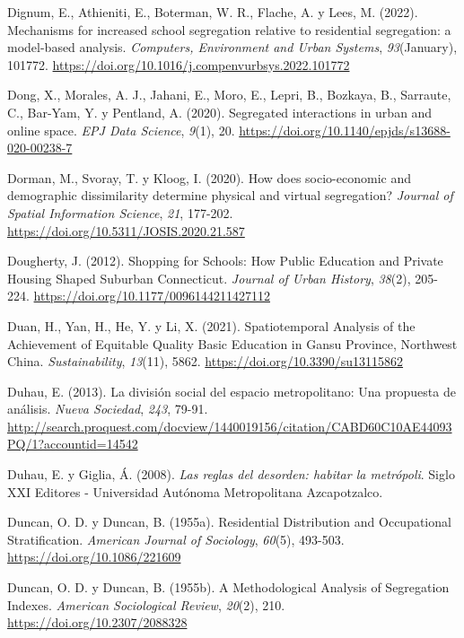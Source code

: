 \documentclass[
  spanish,
  a4paper,%
  chapterprefix=true,%
  DIV=calc,%
  twoside]{scrbook}%
\newlength{\cslhangindent}
\newenvironment{CSLReferences}[2] %
 {\begin{list}{}{%
  \setlength{\itemindent}{0pt}
  \setlength{\leftmargin}{0pt}
  \setlength{\parsep}{0pt}
  \ifodd #1
   \setlength{\leftmargin}{\cslhangindent}
   \setlength{\itemindent}{-1\cslhangindent}
  \fi
  \setlength{\itemsep}{#2\baselineskip}}}
 {\end{list}}
\begin{document}
\begin{CSLReferences}{1}{0}
Dignum, E., Athieniti, E., Boterman, W. R., Flache, A. y Lees, M. (2022). Mechanisms for increased school segregation relative to residential segregation: a model-based analysis. \emph{Computers, Environment and Urban Systems}, \emph{93}(January), 101772. \url{https://doi.org/10.1016/j.compenvurbsys.2022.101772}

Dong, X., Morales, A. J., Jahani, E., Moro, E., Lepri, B., Bozkaya, B., Sarraute, C., Bar-Yam, Y. y Pentland, A. (2020). Segregated interactions in urban and online space. \emph{EPJ Data Science}, \emph{9}(1), 20. \url{https://doi.org/10.1140/epjds/s13688-020-00238-7}

Dorman, M., Svoray, T. y Kloog, I. (2020). How does socio-economic and demographic dissimilarity determine physical and virtual segregation? \emph{Journal of Spatial Information Science}, \emph{21}, 177-202. \url{https://doi.org/10.5311/JOSIS.2020.21.587}

Dougherty, J. (2012). Shopping for Schools: How Public Education and Private Housing Shaped Suburban Connecticut. \emph{Journal of Urban History}, \emph{38}(2), 205-224. \url{https://doi.org/10.1177/0096144211427112}

Duan, H., Yan, H., He, Y. y Li, X. (2021). Spatiotemporal Analysis of the Achievement of Equitable Quality Basic Education in Gansu Province, Northwest China. \emph{Sustainability}, \emph{13}(11), 5862. \url{https://doi.org/10.3390/su13115862}

Duhau, E. (2013). La división social del espacio metropolitano: Una propuesta de análisis. \emph{Nueva Sociedad}, \emph{243}, 79-91. \url{http://search.proquest.com/docview/1440019156/citation/CABD60C10AE44093PQ/1?accountid=14542}

Duhau, E. y Giglia, Á. (2008). \emph{Las reglas del desorden: habitar la metrópoli}. Siglo XXI Editores - Universidad Autónoma Metropolitana Azcapotzalco.

Duncan, O. D. y Duncan, B. (1955a). Residential Distribution and Occupational Stratification. \emph{American Journal of Sociology}, \emph{60}(5), 493-503. \url{https://doi.org/10.1086/221609}

Duncan, O. D. y Duncan, B. (1955b). A Methodological Analysis of Segregation Indexes. \emph{American Sociological Review}, \emph{20}(2), 210. \url{https://doi.org/10.2307/2088328}


\end{CSLReferences}
\end{document}
